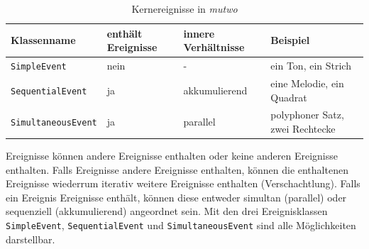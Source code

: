 \documentclass[12pt,a4paper,ngerman]{article}
\begin{document}
\bigskip


% 

\begin{table}[h!]
    \begin{center}
        \begin{tabular}{l l l l} 
            \hline
            Klassenname & enthält Ereignisse & innere Verhältnisse & Beispiel \\ [0.5ex] 
            \hline\hline
            \texttt{SimpleEvent} & nein & - & ein Ton, ein Strich \\ 
            \texttt{SequentialEvent} & ja & akkumulierend & eine Melodie, ein Quadrat \\ 
            \texttt{SimultaneousEvent} & ja & parallel & polyphoner Satz, zwei Rechtecke \\ [1ex] 
            \hline
        \end{tabular}
    \end{center}

    \caption{Kernereignisse in \emph{mutwo}}
\end{table}

Ereignisse können andere Ereignisse enthalten oder keine anderen Ereignisse enthalten.
Falls Ereignisse andere Ereignisse enthalten, können die enthaltenen Ereignisse wiederrum iterativ weitere Ereignisse enthalten (Verschachtlung).
Falls ein Ereignis Ereignisse enthält, können diese entweder simultan (parallel) oder sequenziell (akkumulierend) angeordnet sein.
Mit den drei Ereignisklassen \texttt{SimpleEvent}, \texttt{SequentialEvent} und \texttt{SimultaneousEvent} sind alle Möglichkeiten darstellbar.
\end{document}
